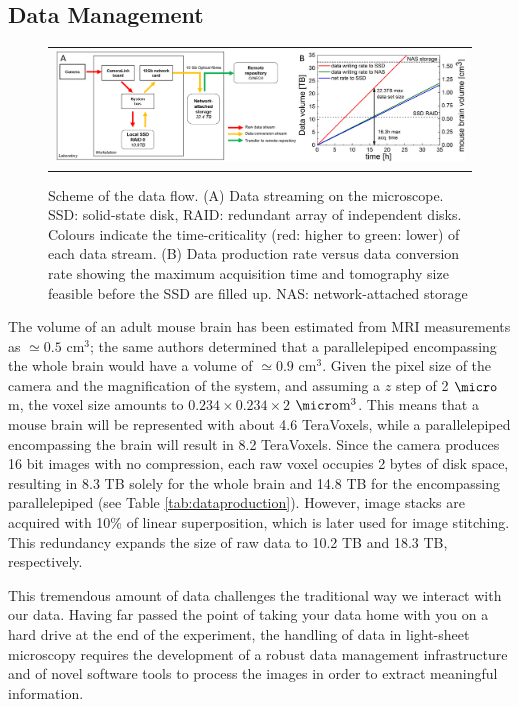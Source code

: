 \documentclass[12pt]{spieman}  %
\begin{document}
\begin{spacing}{2}
\section{Data Management}
\label{sec:dataflow}


	\begin{figure}
   \begin{center}
   \begin{tabular}{c}
   \includegraphics[width=\textwidth]{panel5.eps}
   \end{tabular}
   \end{center}
   \caption{\label{fig:DataFlow} Scheme of the data flow. (A) Data streaming on the microscope. SSD: solid-state disk, RAID: redundant array of independent disks. Colours indicate the time-criticality (red: higher to green: lower) of each data stream. (B) Data production rate versus data conversion rate showing the maximum acquisition time and tomography size feasible before the SSD are filled up. NAS: network-attached storage} 
   \end{figure}

The volume of an adult mouse brain has been estimated from MRI measurements \cite{Kovacevic2005} as $\simeq 0.5$ $\text{cm}^3$; the same authors determined that a parallelepiped encompassing the whole brain would have a volume of $\simeq 0.9$ $\text{cm}^3$. Given the pixel size of the camera and the magnification of the system, and assuming a $z$ step of 2 $\micro$m, the voxel size amounts to $0.234\times0.234\times2$ $\micro\text{m}^3$. This means that a mouse brain will be represented with about 4.6 TeraVoxels, while a parallelepiped encompassing the brain will result in 8.2 TeraVoxels. Since the camera produces 16 bit images with no compression, each raw voxel occupies 2 bytes of disk space, resulting in 8.3 TB solely for the whole brain and 14.8 TB for the encompassing parallelepiped (see Table \ref{tab:dataproduction}). However, image stacks are acquired with 10\% of linear superposition, which is later used for image stitching. This redundancy expands the size of raw data to 10.2 TB and 18.3 TB, respectively.

This tremendous amount of data challenges the traditional way we interact with our data. Having far passed the point of taking your data home with you on a hard drive at the end of the experiment, the handling of data in light-sheet microscopy requires the development of a robust data management infrastructure and of novel software tools to process the images in order to extract meaningful information.


\end{spacing}
\end{document}

